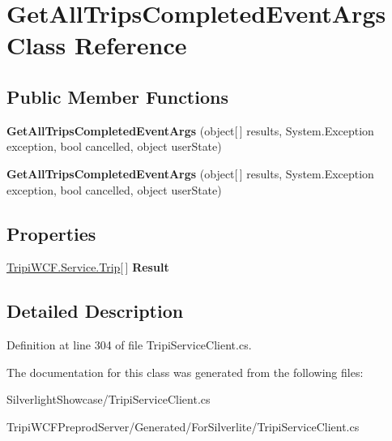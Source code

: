 \hypertarget{class_get_all_trips_completed_event_args}{
\section{GetAllTripsCompletedEventArgs Class Reference}
\label{class_get_all_trips_completed_event_args}
}
\subsection*{Public Member Functions}
\begin{DoxyCompactItemize}
\item 
\hypertarget{class_get_all_trips_completed_event_args_a82112890cb7ec62bb724b2ec977e566d}{
{\bfseries GetAllTripsCompletedEventArgs} (object\mbox{[}$\,$\mbox{]} results, System.Exception exception, bool cancelled, object userState)}
\label{class_get_all_trips_completed_event_args_a82112890cb7ec62bb724b2ec977e566d}

\item 
\hypertarget{class_get_all_trips_completed_event_args_a82112890cb7ec62bb724b2ec977e566d}{
{\bfseries GetAllTripsCompletedEventArgs} (object\mbox{[}$\,$\mbox{]} results, System.Exception exception, bool cancelled, object userState)}
\label{class_get_all_trips_completed_event_args_a82112890cb7ec62bb724b2ec977e566d}

\end{DoxyCompactItemize}
\subsection*{Properties}
\begin{DoxyCompactItemize}
\item 
\hypertarget{class_get_all_trips_completed_event_args_ac6909c066bc841dc28893188c6732eb8}{
\hyperlink{class_tripi_w_c_f_1_1_service_1_1_trip}{TripiWCF.Service.Trip}\mbox{[}$\,$\mbox{]} {\bfseries Result}}
\label{class_get_all_trips_completed_event_args_ac6909c066bc841dc28893188c6732eb8}

\end{DoxyCompactItemize}


\subsection{Detailed Description}


Definition at line 304 of file TripiServiceClient.cs.

The documentation for this class was generated from the following files:\begin{DoxyCompactItemize}
\item 
SilverlightShowcase/TripiServiceClient.cs\item 
TripiWCFPreprodServer/Generated/ForSilverlite/TripiServiceClient.cs\end{DoxyCompactItemize}
